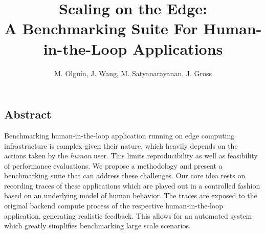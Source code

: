 \documentclass[portrait, a1]{KTHEEposter}
\begin{document}
    
    \title{\LARGE\bfseries Scaling on the Edge:\\A Benchmarking Suite For Human-in-the-Loop Applications}
    
    \author{\Large M. Olguín, J. Wang, M. Satyanarayanan, J. Gross}
    \maketitle
    
    \begin{pcolumns}[3]
        \begin{pcolumn}[2]
            \begin{pframe}[.67]
                \section{Abstract}
                Benchmarking human-in-the-loop application running on edge computing infrastructure is complex given their nature, which heavily depends on the actions taken by the \emph{human} user.
                This limits reproducibility as well as feasibility of performance evaluations.
                We propose a methodology and present a benchmarking suite that can address these challenges.
                Our core idea rests on recording traces of these applications which are played out in a controlled fashion based on an underlying model of human behavior.
                The traces are exposed to the original backend compute process of the respective human-in-the-loop application, generating realistic feedback.
                This allows for an automated system which greatly simplifies benchmarking large scale scenarios.
            \end{pframe}
            \begin{pframe}[1.33]

\end{pframe}
\end{pcolumn}
\end{pcolumns}
\end{document}
